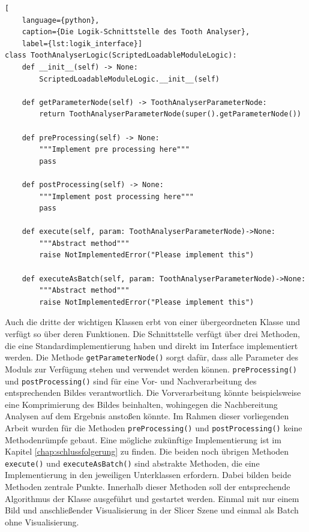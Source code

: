 \begin{lstlisting}[
    language={python},
    caption={Die Logik-Schnittstelle des Tooth Analyser},
    label={lst:logik_interface}]
class ToothAnalyserLogic(ScriptedLoadableModuleLogic):
    def __init__(self) -> None:
        ScriptedLoadableModuleLogic.__init__(self)

    def getParameterNode(self) -> ToothAnalyserParameterNode:
        return ToothAnalyserParameterNode(super().getParameterNode())

    def preProcessing(self) -> None:
        """Implement pre processing here"""
        pass

    def postProcessing(self) -> None:
        """Implement post processing here"""
        pass

    def execute(self, param: ToothAnalyserParameterNode)->None:
        """Abstract method"""
        raise NotImplementedError("Please implement this")

    def executeAsBatch(self, param: ToothAnalyserParameterNode)->None:
        """Abstract method"""
        raise NotImplementedError("Please implement this")
\end{lstlisting}

Auch die dritte der wichtigen Klassen erbt von einer übergeordneten Klasse und
verfügt so über deren Funktionen. Die Schnittstelle verfügt über drei Methoden,
die eine Standardimplementierung haben und direkt im Interface implementiert
werden. Die Methode \texttt{getParameterNode()} sorgt dafür, dass alle Parameter
des Moduls zur Verfügung stehen und verwendet werden können. \texttt{preProcessing()}
und \texttt{postProcessing()} sind für eine Vor- und Nachverarbeitung des entsprechenden
Bildes verantwortlich. Die Vorverarbeitung könnte beispielsweise eine
Komprimierung des Bildes beinhalten, wohingegen die Nachbereitung Analysen auf dem
Ergebnis anstoßen könnte. Im Rahmen dieser vorliegenden Arbeit wurden für die
Methoden \texttt{preProcessing()} und \texttt{postProcessing()} keine
Methodenrümpfe gebaut. Eine mögliche zukünftige Implementierung ist im Kapitel \ref{chap:schlussfolgerung}
zu finden. Die beiden noch übrigen Methoden \texttt{execute()} und \texttt{executeAsBatch()}
sind abstrakte Methoden, die eine Implementierung in den jeweiligen Unterklassen
erfordern. Dabei bilden beide Methoden zentrale Punkte. Innerhalb dieser Methoden
soll der entsprechende Algorithmus der Klasse ausgeführt und gestartet werden.
Einmal mit nur einem Bild und anschließender Visualisierung in der Slicer Szene
und einmal als Batch ohne Visualisierung.

